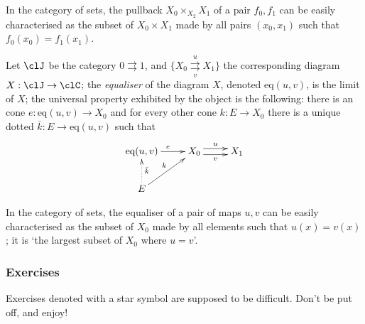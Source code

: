 \documentclass[11pt]{article}
\begin{document}
In the category of sets, the pullback $X_0 \times_{X_2} X_1$ of a pair $f_0, f_1$ can be easily characterised as the subset of $X_0\times X_1$ made by all pairs $(x_0, x_1)$ such that $f_0(x_0)=f_1(x_1)$.
\begin{example}[Equaliser]\label{ex:equal}
	Let $\clJ$ be the category $0\rightrightarrows 1$, and $\{X_0 \underset{v}{\overset{u}\rightrightarrows} X_1\}$ the corresponding diagram $X : \clJ\to \clC$; the \emph{equaliser} of the diagram $X$, denoted $\text{eq}(u,v)$, is the limit of $X$; the universal property exhibited by the object is the following: there is an cone $ e : \text{eq}(u,v) \to X_0$ and for every other cone $k : E \to X_0$ there is a unique dotted $\bar k : E \to \text{eq}(u,v)$ such that
	\[
		\vcenter{\xymatrix{
				\text{eq}(u,v) \ar[r]^e & X_0 \ar@<3pt>[r]^u \ar@<-3pt>[r]_v & X_1 \\
				E\ar[ur]^k \ar@{.>}[u]_{\bar k}
			}}
	\]
\end{example}
In the category of sets, the equaliser of a pair of maps $u,v$ can be easily characterised as the subset of $X_0$ made by all elements such that $u(x)=v(x)$; it is `the largest subset of $X_0$ where $u=v$'.
\subsubsection{Exercises}
Exercises denoted with a star symbol are supposed to be difficult. Don't be put off, and enjoy!
\end{document}
